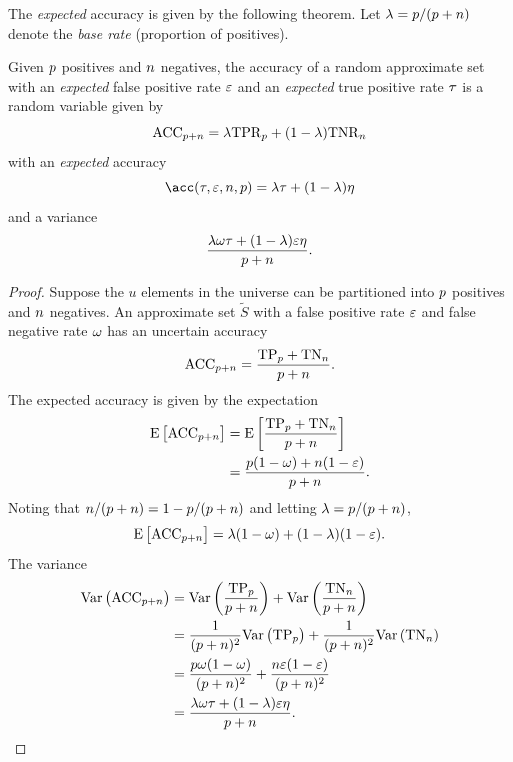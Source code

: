 The \emph{expected} accuracy is given by the following theorem.
Let $\lambda = p / (p + n)$ denote the \emph{base rate} (proportion of positives).
\begin{theorem}
	\label{thm:approx_expected_accuracy}
	Given $p$ positives and $n$ negatives, the accuracy of a random approximate set with an
	\emph{expected} false positive rate $\varepsilon$ and an \emph{expected} true
	positive rate $\tau$ is a random variable given by
	\begin{equation}
	\mathrm{ACC}_{p + n} = \lambda \mathrm{TPR}_p + (1 - \lambda) \mathrm{TNR}_n
	\end{equation}
	with an \emph{expected} accuracy
	\begin{equation}
	\label{eq:approx_expected_accuracy}
	\acc(\tprate,\fprate,\n,\p) = \lambda \tprate + (1-\lambda) \tnrate
	\end{equation}
	and a variance
	\begin{equation}
	\frac{\lambda \omega \tau + (1 - \lambda)\varepsilon
		\eta}{p+n}.
	\end{equation}
\end{theorem}
\begin{proof}
	Suppose the $u$ elements in the universe can be partitioned into $p$
	positives and $n$ negatives. An approximate set $\tilde{S}$ with a false
	positive rate $\varepsilon$ and false negative rate $\omega$ has an uncertain
	accuracy
	\begin{equation}
	\mathrm{ACC}_{p + n} = \frac{\mathrm{TP}_p + \mathrm{TN}_n}{p + n}.
	\end{equation}
	The expected accuracy is given by the expectation
	\begin{align}
	\Expect{\ACC_{\p + \n}}
	&= \Expect{\frac{\TP_\p + \TN_\n}{\p + \n}}\\
	&= \frac{\p (1 - \fnrate) + \n (1 - \fprate)}{\p + \n}.
	\end{align}
	Noting that $n/(p+n) = 1 - p/(p+n)$ and letting $\lambda = p/(p +
	n)$,
	\begin{equation}
	\Expect{\ACC_{\p + \n}} = \lambda (1 - \fnrate) + (1 - \lambda) (1 -
	\fprate).
	\end{equation}
	The variance
	\begin{align}
	\Var{\ACC_{\p + \n}}
	&= \Var{\frac{\TP_\p}{\p + \n}} + \Var{\frac{\TN_\n}{\p + \n}}\\
	&= \frac{1}{(\p + \n)^2}\Var{\TP_\p} + \frac{1}{(\p + \n)^2}\Var{\TN_\n}\\
	&= \frac{\p \fnrate (1 - \fnrate)}{(\p + \n)^2} + \frac{\n \fprate (1 -
		\fprate)}{(\p + \n)^2}\\
	&= \frac{\lambda \fnrate \tprate + (1 - \lambda)\fprate
		\tnrate}{\p+\n}.
	\end{align}
\end{proof}

